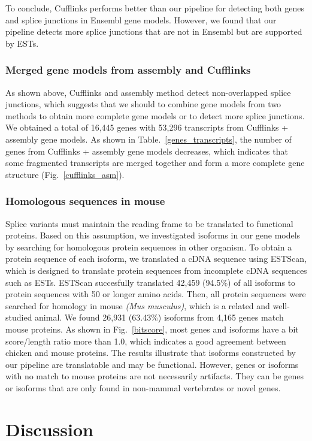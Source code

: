 \documentclass[10pt]{article}
\begin{document}
To conclude, Cufflinks performs better than our pipeline for detecting both genes and splice junctions in Ensembl gene models.
However, we found that our pipeline detects more splice junctions that are not in Ensembl but are supported by ESTs.


\subsubsection*{Merged gene models from assembly and Cufflinks}
As shown above, Cufflinks and assembly method detect non-overlapped splice junctions,
which suggests that we should to combine gene models from two methods to
obtain more complete gene models or to detect more splice junctions.
We obtained a total of 16,445 genes with 53,296 transcripts from Cufflinks + assembly gene models.
As shown in Table.~\ref{genes_transcripts}, the number of genes from Cufflinks + assembly gene models
decreases, which indicates that some fragmented transcripts are merged together and form a more complete gene structure (Fig.~\ref{cufflinks_asm}).

\subsubsection*{Homologous sequences in mouse}
Splice variants must maintain the reading frame to be translated to functional proteins.
Based on this assumption, we investigated isoforms in our gene models by searching for homologous protein sequences in
other organism.
To obtain a protein sequence of each isoform, we translated a cDNA sequence using ESTScan\cite{Iseli:1999vd},
which is designed to translate
protein sequences from incomplete cDNA sequences such as ESTs.
ESTScan succesfully translated 42,459 (94.5\%) of all isoforms to protein sequences with 50 or longer amino acids.
Then, all protein sequences were searched for homology in mouse \textit{(Mus musculus)}, which is a related and well-studied animal.
We found 26,931 (63.43\%) isoforms from 4,165 genes match mouse proteins.
As shown in Fig.~\ref{bitscore}, most genes and isoforms have a bit score/length ratio more than 1.0, which
indicates a good agreement between chicken and mouse proteins.
The results illustrate that isoforms constructed by our pipeline are translatable and may be functional.
However, genes or isoforms with no match to mouse proteins are not necessarily artifacts.
They can be genes or isoforms that are only found in non-mammal vertebrates or novel genes.

\section*{Discussion}
\end{document}
